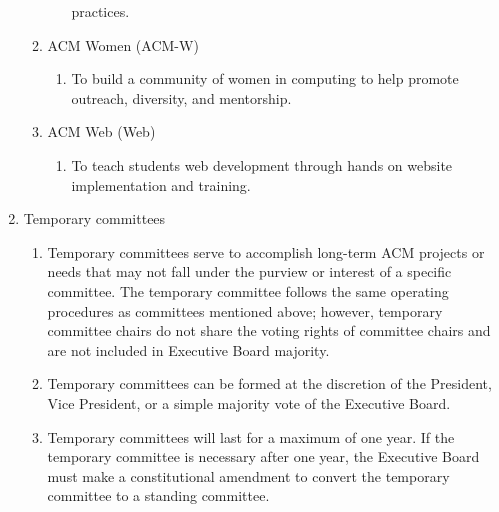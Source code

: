 \begin{enumerate}[label=\Alph*.]
\begin{enumerate}
\begin{enumerate}
            practices.
        \end{enumerate}
      \item ACM Women (ACM-W)
        \begin{enumerate}
          \item To build a community of women in computing to help promote
            outreach, diversity, and mentorship.
        \end{enumerate}
      \item ACM Web (Web)
        \begin{enumerate}
          \item To teach students web development through hands on website
            implementation and training.
        \end{enumerate}
      \end{enumerate}
  \item Temporary committees
    \begin{enumerate}
      \item Temporary committees serve to accomplish long-term ACM projects or
        needs that may not fall under the purview or interest of a specific
        committee. The temporary committee follows the same operating procedures
        as committees mentioned above; however, temporary committee chairs do
        not share the voting rights of committee chairs and are not included in
        Executive Board majority.
      \item Temporary committees can be formed at the discretion of the
        President, Vice President, or a simple majority vote of the Executive
        Board.
      \item Temporary committees will last for a maximum of one year. If the
        temporary committee is necessary after one year, the Executive Board
        must make a constitutional amendment to convert the temporary committee
        to a standing committee.
    \end{enumerate}
\end{enumerate}
